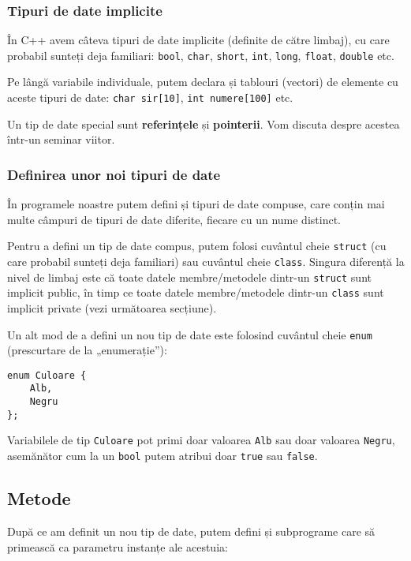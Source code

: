 \subsubsection*{Tipuri de date implicite}

În C++ avem câteva tipuri de date implicite (definite de către limbaj), cu care probabil sunteți deja familiari: \texttt{bool}, \texttt{char}, \texttt{short}, \texttt{int}, \texttt{long}, \texttt{float}, \texttt{double} etc.

Pe lângă variabile individuale, putem declara și tablouri (vectori) de elemente cu aceste tipuri de date: \texttt{char sir[10]}, \texttt{int numere[100]} etc.

Un tip de date special sunt \textbf{referințele} și \textbf{pointerii}. Vom discuta despre acestea într-un seminar viitor.

\subsubsection*{Definirea unor noi tipuri de date}

În programele noastre putem defini și tipuri de date compuse, care conțin mai multe câmpuri de tipuri de date diferite, fiecare cu un nume distinct.

Pentru a defini un tip de date compus, putem folosi cuvântul cheie \texttt{struct} (cu care probabil sunteți deja familiari) sau cuvântul cheie \texttt{class}. Singura diferență la nivel de limbaj este că toate datele membre/metodele dintr-un \texttt{struct} sunt implicit public, în timp ce toate datele membre/metodele dintr-un \texttt{class} sunt implicit private (vezi următoarea secțiune).

Un alt mod de a defini un nou tip de date este folosind cuvântul cheie \texttt{enum} (prescurtare de la „enumerație”):
\begin{lstlisting}
enum Culoare {
    Alb,
    Negru
};
\end{lstlisting}
Variabilele de tip \texttt{Culoare} pot primi doar valoarea \texttt{Alb} sau doar valoarea \texttt{Negru}, asemănător cum la un \texttt{bool} putem atribui doar \texttt{true} sau \texttt{false}.

\subsection*{Metode}

După ce am definit un nou tip de date, putem defini și subprograme care să primească ca parametru instanțe ale acestuia:

